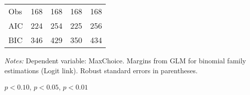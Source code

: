 \begin{table}[htbp]
\begin{threeparttable}
\begin{tabular}{l*{4}{D{.}{.}{-1}}}
Obs                 &                 168   &                 168   &                 168   &                 168   \\
AIC                 &                 224   &                 254   &                 225   &                 256   \\
BIC                 &                 346   &                 429   &                 350   &                 434   \\
\bottomrule
\end{tabular}
\begin{tablenotes}
\footnotesize
\item \textit{Notes:} Dependent variable: MaxChoice. Margins from GLM for binomial family estimations (Logit link). Robust standard errors in parentheses.
\item \sym{*} \(p<0.10\), \sym{**} \(p<0.05\), \sym{***} \(p<0.01\)
\end{tablenotes}
\end{threeparttable}
\label{tab:maxchoice_totaltr}
\end{table}